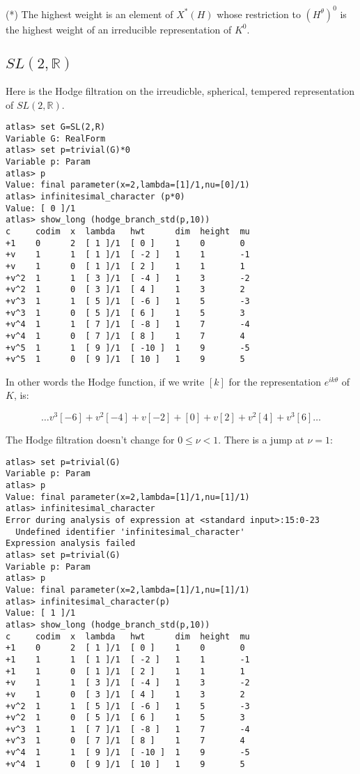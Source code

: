 \documentclass[12pt,leqno]{article}
\newcommand{\R}{\mathbb R}
\newcommand{\subsec}[1]{\subsection{#1}
\renewcommand{\theequation}{\thesubsection.\arabic{equation}}}
\begin{document}
\noindent (*) The highest weight is an element of $X^*(H)$ whose restriction
to $(H^{\theta})^0$ is the highest weight of an irreducible representation of $K^0$.

\subsec{$SL(2,\R)$}

Here is the Hodge filtration on the irreudicble, spherical, tempered
representation of $SL(2,\R)$.

\begin{verbatim}atlas> set G=SL(2,R)
Variable G: RealForm
atlas> set p=trivial(G)*0
Variable p: Param
atlas> p
Value: final parameter(x=2,lambda=[1]/1,nu=[0]/1)
atlas> infinitesimal_character (p*0)
Value: [ 0 ]/1
atlas> show_long (hodge_branch_std(p,10))
c     codim  x  lambda   hwt      dim  height  mu
+1    0      2  [ 1 ]/1  [ 0 ]    1    0       0
+v    1      1  [ 1 ]/1  [ -2 ]   1    1       -1
+v    1      0  [ 1 ]/1  [ 2 ]    1    1       1
+v^2  1      1  [ 3 ]/1  [ -4 ]   1    3       -2
+v^2  1      0  [ 3 ]/1  [ 4 ]    1    3       2
+v^3  1      1  [ 5 ]/1  [ -6 ]   1    5       -3
+v^3  1      0  [ 5 ]/1  [ 6 ]    1    5       3
+v^4  1      1  [ 7 ]/1  [ -8 ]   1    7       -4
+v^4  1      0  [ 7 ]/1  [ 8 ]    1    7       4
+v^5  1      1  [ 9 ]/1  [ -10 ]  1    9       -5
+v^5  1      0  [ 9 ]/1  [ 10 ]   1    9       5
\end{verbatim}

In other words the Hodge function, if we write $[k]$ for the representation $e^{ik\theta}$ of $K$, is:

$$
\dots v^3[-6]+ v^2[-4] + v[-2] + [0] + v[2] + v^2[4] + v^3[6]\dots
$$

The Hodge filtration doesn't change for $0\le \nu<1$. There is a jump at $\nu=1$:

\begin{verbatim}
atlas> set p=trivial(G)
Variable p: Param
atlas> p
Value: final parameter(x=2,lambda=[1]/1,nu=[1]/1)
atlas> infinitesimal_character
Error during analysis of expression at <standard input>:15:0-23
  Undefined identifier 'infinitesimal_character'
Expression analysis failed
atlas> set p=trivial(G)
Variable p: Param
atlas> p
Value: final parameter(x=2,lambda=[1]/1,nu=[1]/1)
atlas> infinitesimal_character(p)
Value: [ 1 ]/1
atlas> show_long (hodge_branch_std(p,10))
c     codim  x  lambda   hwt      dim  height  mu
+1    0      2  [ 1 ]/1  [ 0 ]    1    0       0
+1    1      1  [ 1 ]/1  [ -2 ]   1    1       -1
+1    1      0  [ 1 ]/1  [ 2 ]    1    1       1
+v    1      1  [ 3 ]/1  [ -4 ]   1    3       -2
+v    1      0  [ 3 ]/1  [ 4 ]    1    3       2
+v^2  1      1  [ 5 ]/1  [ -6 ]   1    5       -3
+v^2  1      0  [ 5 ]/1  [ 6 ]    1    5       3
+v^3  1      1  [ 7 ]/1  [ -8 ]   1    7       -4
+v^3  1      0  [ 7 ]/1  [ 8 ]    1    7       4
+v^4  1      1  [ 9 ]/1  [ -10 ]  1    9       -5
+v^4  1      0  [ 9 ]/1  [ 10 ]   1    9       5
\end{verbatim}
\end{document}
